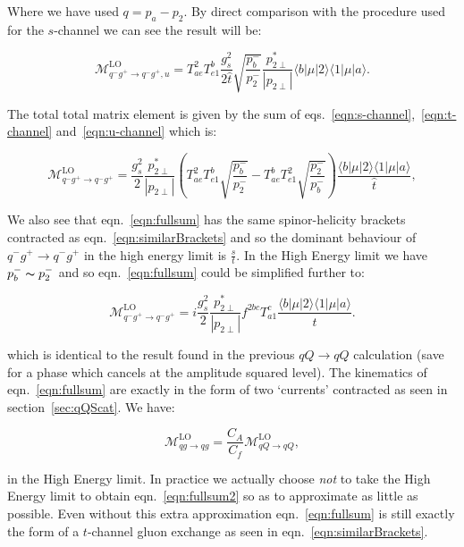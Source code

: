 		Where we have used $q=p_a-p_2$.  By direct comparison with the procedure used for the $s$-channel we can see the result will be:

		\begin{equation}
		\mathcal{M}_{q^-g^+\to q^-g^+, u}^{\text{LO}}=
		T^2_{ae}T^b_{e1}\frac{g_s^2}{2\hat{t}}\sqrt{\frac{p_b^-}{p_2^-}}\frac{p^*_{2\perp}}{|p_{2\perp}|}\langle{b}|\mu|2\rangle\langle{1}|\mu|a\rangle.
		\label{eqn:u-channel}
		\end{equation}

		The total total matrix element is given by the sum of eqs.~\eqref{eqn:s-channel},~\eqref{eqn:t-channel} and~\eqref{eqn:u-channel} which is:

		\begin{equation}
			\mathcal{M}_{q^-g^+\to q^-g^+}^{\text{LO}}=
			\frac{g_s^2}{2}\frac{p_{2\perp}^*}{|p_{2\perp}|}\left(T^2_{ae}T^b_{e1}\sqrt{\frac{p_b^-}{p_2^-}}-T^b_{ae}T^2_{e1}
			\sqrt{\frac{p_2^-}{p_b^-}}\right)\frac{\langle{b}|\mu|2\rangle\langle{1}|\mu|a\rangle}{\hat{t}},
			\label{eqn:fullsum}
		\end{equation}

		We also see that eqn.~\eqref{eqn:fullsum} has the same spinor-helicity brackets contracted as eqn.~\eqref{eqn:similarBrackets}
		and so the dominant behaviour of $q^-g^+\to q^-g^+$ in the high energy limit is $\frac{s}{t}$.
		In the High Energy limit we have $p_b^-\thicksim p_2^-$ and so eqn.~\eqref{eqn:fullsum} could be simplified
		further to:

		\begin{equation}
			\mathcal{M}_{q^-g^+\to q^-g^+}^{\text{LO}}=i\frac{g_s^2}{2}\frac{p_{2\perp}^*}{|p_{2\perp}|}f^{2bc}T^c_{a1}
			\frac{\langle{b}|\mu|2\rangle\langle{1}|\mu|a\rangle}{\hat{t}}.
			\label{eqn:fullsum2}
		\end{equation}

		which is identical to the result found in the previous $qQ\rightarrow qQ$ calculation (save for a phase which cancels
		at the amplitude squared level). The kinematics of eqn.~\eqref{eqn:fullsum} are exactly in the form of two `currents' contracted as
		seen in section~\ref{sec:qQScat}.  We have:

		\begin{equation}
			\mathcal{M}_{qg\to qg}^{\text{LO}} = \frac{C_A}{C_f} \mathcal{M}_{qQ\to qQ}^{\text{LO}},
		\end{equation}

		in the High Energy limit. In practice we actually choose \emph{not} to take the High Energy limit to obtain
		eqn.~\eqref{eqn:fullsum2} so as to approximate as little as possible.  Even without this extra approximation
		eqn.~\eqref{eqn:fullsum} is still exactly the form of a $t$-channel gluon exchange as seen in
		eqn.~\eqref{eqn:similarBrackets}.

